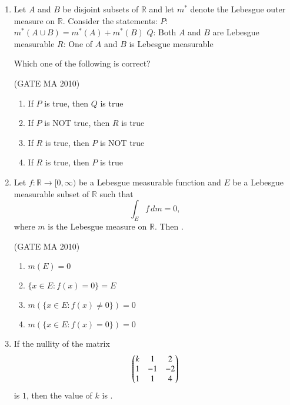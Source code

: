 \documentclass[journal,12pt,onecolumn]{IEEEtran}
\theoremstyle{remark}
\begin{document}
\begin{flushleft}
\begin{enumerate}
\begin{enumerate}
\end{enumerate}

\item Let $A$ and $B$ be disjoint subsets of $\mathbb{R}$ and let $m^*$ denote the Lebesgue outer measure on $\mathbb{R}$.  
Consider the statements:  
$P$: $m^*(A\cup B)=m^*(A)+m^*(B)$  
$Q$: Both $A$ and $B$ are Lebesgue measurable  
$R$: One of $A$ and $B$ is Lebesgue measurable  

Which one of the following is correct? \underline{\hspace{2cm}}

\hfill(GATE MA 2010)

\begin{enumerate}
\item If $P$ is true, then $Q$ is true
\item If $P$ is NOT true, then $R$ is true
\item If $R$ is true, then $P$ is NOT true
\item If $R$ is true, then $P$ is true
\end{enumerate}

\item Let $f:\mathbb{R}\to [0,\infty)$ be a Lebesgue measurable function and $E$ be a Lebesgue measurable subset of $\mathbb{R}$ such that 
\[
\int_E f\,dm=0,
\]
where $m$ is the Lebesgue measure on $\mathbb{R}$. Then \underline{\hspace{2cm}}.

\hfill(GATE MA 2010)

\begin{enumerate}
\item $m(E)=0$
\item $\{x\in E:f(x)=0\}=E$
\item $m(\{x\in E:f(x)\neq 0\})=0$
\item $m(\{x\in E:f(x)=0\})=0$
\end{enumerate}
\newpage
\item If the nullity of the matrix 
\[
\begin{pmatrix} k & 1 & 2 \\ 1 & -1 & -2 \\ 1 & 1 & 4 \end{pmatrix}
\]
is $1$, then the value of $k$ is \underline{\hspace{2cm}}.


\end{enumerate}
\end{flushleft}
\end{document}
